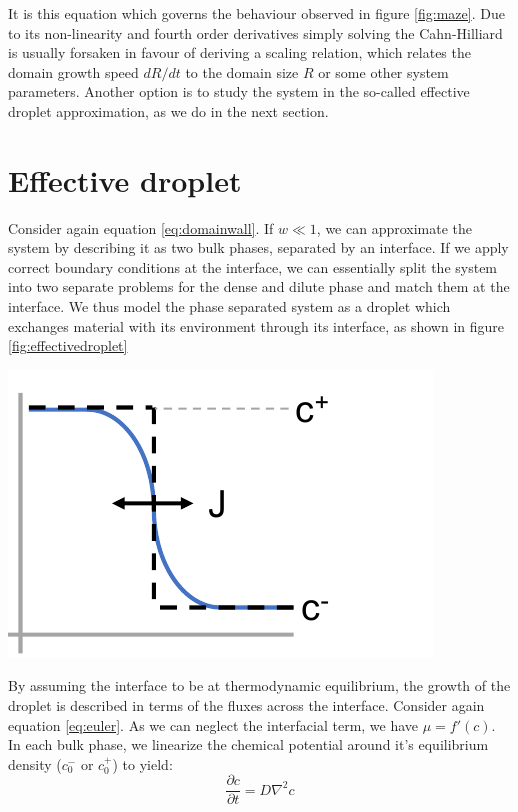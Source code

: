 \documentclass{Dissertate}
\let\origfigure\figure
\let\endorigfigure\endfigure
\renewenvironment{figure}[1][2] {
    \expandafter\origfigure\expandafter[H]
} {
    \endorigfigure
}
\begin{document}
It is this equation which governs the behaviour observed in figure
\ref{fig:maze}. Due to its non-linearity and fourth order
derivatives simply solving the Cahn-Hilliard is usually forsaken in
favour of deriving a scaling relation, which relates the domain growth
speed \(dR/dt\) to the domain size \(R\) or some other system
parameters. Another option is to study the system in the so-called
effective droplet approximation, as we do in the next section.

\hypertarget{effective-droplet}{%
\section{Effective droplet}\label{effective-droplet}}

Consider again equation \ref{eq:domainwall}. If \(w\ll1\), we can
approximate the system by describing it as two bulk phases, separated by
an interface. If we apply correct boundary conditions at the interface,
we can essentially split the system into two separate problems for the
dense and dilute phase and match them at the interface. We thus model
the phase separated system as a droplet which exchanges material with
its environment through its interface, as shown in figure
\ref{fig:effectivedroplet}

\begin{figure}
\hypertarget{fig:effectivedroplet}{%
\centering
\includegraphics{source/figures/pdf/effectivedroplet.pdf}
\caption{Model of an effective droplet. Blue line is full Cahn-Hilliard,
black dashed line effective droplet.}\label{fig:effectivedroplet}
}
\end{figure}

By assuming the interface to be at thermodynamic equilibrium, the growth
of the droplet is described in terms of the fluxes across the interface.
Consider again equation \ref{eq:euler}. As we can neglect the
interfacial term, we have \(\mu = f'(c)\). In each bulk phase, we
linearize the chemical potential around it's equilibrium density
(\(c_0^-\) or \(c_0^+\)) to yield: \begin{equation}
\frac{\partial c }{\partial t} = D\nabla^2c
\label{eq:diffusion}\end{equation}
\end{document}
